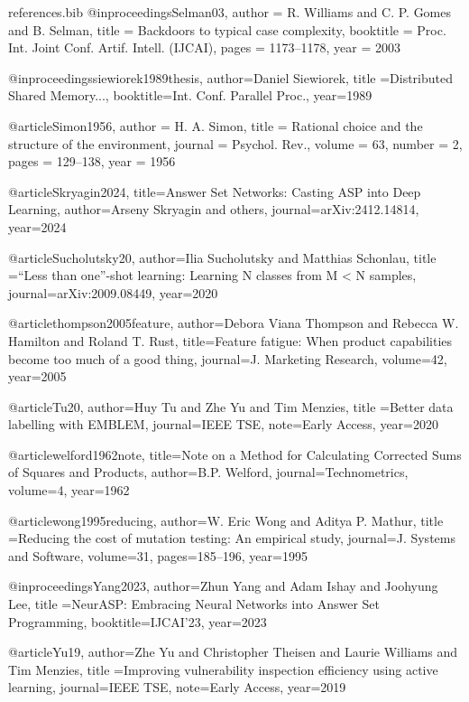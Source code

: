 \documentclass[pdflatex,sn-basic]{sn-jnl}
\begin{document}
\begin{filecontents}{references.bib}
@inproceedings{Selman03,
  author    = {R. Williams and C. P. Gomes and B. Selman},
  title     = {Backdoors to typical case complexity},
  booktitle = {Proc. Int. Joint Conf. Artif. Intell. (IJCAI)},
  pages     = {1173--1178},
  year      = {2003}
}

@inproceedings{siewiorek1989thesis,
  author={Daniel Siewiorek},
  title ={Distributed Shared Memory...},
  booktitle={Int. Conf. Parallel Proc.}, year={1989}
}

@article{Simon1956,
  author  = {H. A. Simon},
  title   = {Rational choice and the structure of the environment},
  journal = {Psychol. Rev.},
  volume  = {63},
  number  = {2},
  pages   = {129--138},
  year    = {1956}
}

@article{Skryagin2024,
  title={Answer Set Networks: Casting ASP into Deep Learning},
  author={Arseny Skryagin and others}, journal={arXiv:2412.14814}, year={2024}
}

@article{Sucholutsky20,
  author={Ilia Sucholutsky and Matthias Schonlau},
  title ={``Less than one''-shot learning: Learning N classes from M < N samples},
  journal={arXiv:2009.08449}, year={2020}
}

@article{thompson2005feature,
  author={Debora Viana Thompson and Rebecca W. Hamilton and Roland T. Rust},
  title={Feature fatigue: When product capabilities become too much of a good thing},
  journal={J. Marketing Research}, volume={42}, year={2005}
}

@article{Tu20,
  author={Huy Tu and Zhe Yu and Tim Menzies},
  title ={Better data labelling with EMBLEM},
  journal={IEEE TSE}, note={Early Access}, year={2020}
}

@article{welford1962note,
  title={Note on a Method for Calculating Corrected Sums of Squares and Products},
  author={B.P. Welford}, journal={Technometrics}, volume={4}, year={1962}
}

@article{wong1995reducing,
  author={W. Eric Wong and Aditya P. Mathur},
  title ={Reducing the cost of mutation testing: An empirical study},
  journal={J. Systems and Software}, volume={31}, pages={185--196}, year={1995}
}

@inproceedings{Yang2023,
  author={Zhun Yang and Adam Ishay and Joohyung Lee},
  title ={NeurASP: Embracing Neural Networks into Answer Set Programming},
  booktitle={IJCAI'23}, year={2023}
}

@article{Yu19,
  author={Zhe Yu and Christopher Theisen and Laurie Williams and Tim Menzies},
  title ={Improving vulnerability inspection efficiency using active learning},
  journal={IEEE TSE}, note={Early Access}, year={2019}
}


\end{filecontents}
\end{document}
